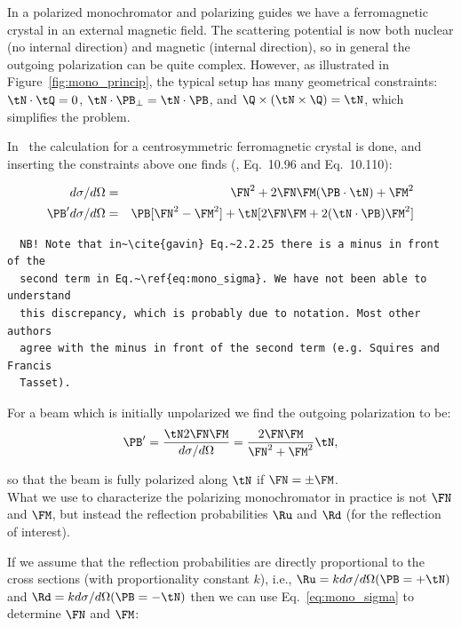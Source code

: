 In a polarized monochromator and polarizing guides we have a ferromagnetic
crystal in an external magnetic field. The scattering potential is now both
nuclear (no internal direction) and magnetic (internal direction), so in
general the outgoing polarization can be quite complex. However, as
illustrated in Figure~\ref{fig:mono_princip}, the typical setup has many
geometrical constraints: $\tN \cdot \tQ = 0$, $\tN \cdot \PB_\perp = \tN \cdot
\PB$, and $\Q \times (\tN \times \Q) = \tN$, which simplifies the problem.

In~\cite{lovesey84} the calculation for a centrosymmetric ferromagnetic
crystal is done, and inserting the constraints above one finds
(\cite{lovesey84}, Eq.~10.96 and Eq.~10.110):

\begin{eqnarray}
  \label{eq:mono_sigma}
  d\sigma/d\Omega & = & \FN^2 + 2\FN\FM (\PB \cdot \tN) + \FM^2\\
  \label{eq:mono_pol}
  \PB' d\sigma/d\Omega & =
  & \PB [\FN^2 - \FM^2] + \tN [2\FN\FM + 2(\tN \cdot \PB)\FM^2]
\end{eqnarray}

\begin{lstlisting}
  NB! Note that in~\cite{gavin} Eq.~2.2.25 there is a minus in front of the
  second term in Eq.~\ref{eq:mono_sigma}. We have not been able to understand
  this discrepancy, which is probably due to notation. Most other authors
  agree with the minus in front of the second term (e.g. Squires and Francis
  Tasset).
\end{lstlisting}

For a beam which is initially unpolarized we find the outgoing
polarization to be:
\begin{equation}
  \PB' = \frac{\tN 2\FN \FM}{d\sigma/d\Omega}
  = \frac{2\FN\FM}{\FN^2 + \FM^2} \tN,
\end{equation}

so that the beam is fully polarized along $\tN$ if $\FN = \pm \FM$. \\

What we use to characterize the polarizing monochromator in practice
is not $\FN$ and $\FM$, but instead the reflection probabilities $\Ru$
and $\Rd$ (for the reflection of interest).

If we assume that the reflection probabilities are directly proportional to
the cross sections (with proportionality constant $k$), i.e., $\Ru = k
d\sigma/d\Omega(\PB=+\tN)$ and $\Rd = k d\sigma/d\Omega(\PB=-\tN)$ then we can
use Eq.~\ref{eq:mono_sigma} to determine $\FN$ and $\FM$:

